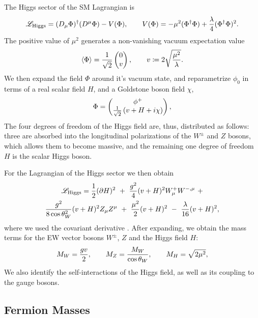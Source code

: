 The Higgs sector of the SM Lagrangian is 
\begin{equation}
{\mathscr{L}}_{\text{Higgs}} = (D_\mu\Phi)^\dagger(D^\mu\Phi)-V(\Phi), \qquad V(\Phi) = -\mu^2(\Phi^\dagger\Phi) + \frac{\lambda}{4}(\Phi^\dagger\Phi)^2.
\label{eq:LH}
\end{equation}
The positive value of $\mu^2$ generates a non-vanishing vacuum expectation value 
\begin{align}
\expval{\Phi}= \frac{1}{\sqrt{2}}\pmqty{0\\v}, \qquad v \coloneqq  2\sqrt{\frac{\mu^2}{\lambda}}.
\end{align}
We then expand the field $\Phi$ around it's vacuum state, and reparametrize $\phi_0$ in terms
of a real scalar field $H$, and a Goldstone boson field $\chi$,
\begin{align} \label{eq:Phiparam}
\Phi=\pmqty{\phi^+\\\frac{1}{\sqrt{2}}\left(v+H+i\chi\right)},
\end{align}
The four degrees of freedom of the Higgs field are, thus, distributed as follows:
three are absorbed into the longitudinal polarizations of the $W^{\pm}$ and $Z$ bosons,
which allows them to become massive,
and the remaining one degree of freedom $H$ is the scalar Higgs boson.

For the Lagrangian of the  Higgs sector we then obtain
\begin{multline}
  {\mathscr{L}}_{\text{Higgs}} 
  = \frac{1}{2}(\partial H)^2 
  ~+~\frac{g^2}{4}(v+H)^2 W^+_\mu W^{-,\mu} ~+ \\
  \frac{g^2}{8\cos \theta_W^2}(v+H)^2 Z_\mu Z^\mu
  ~+~ \frac{\mu^2}{2} (v+H)^2
  ~-~ \frac{\lambda}{16} (v+H)^2,
\end{multline}
where we used the covariant derivative .
After expanding, we obtain the mass terms for the EW vector bosons $W^\pm$, $Z$ and the Higgs field $H$:
\begin{equation}
  M_W = \frac{gv}{2}, \qquad M_Z = \frac{M_W}{\cos \theta_W}, \qquad M_H = \sqrt{2\mu^2},
\end{equation}
We also identify the self-interactions of the Higgs field, as well as its coupling to the gauge bosons.



\subsection{Fermion Masses}
\label{sec:fermmass}

